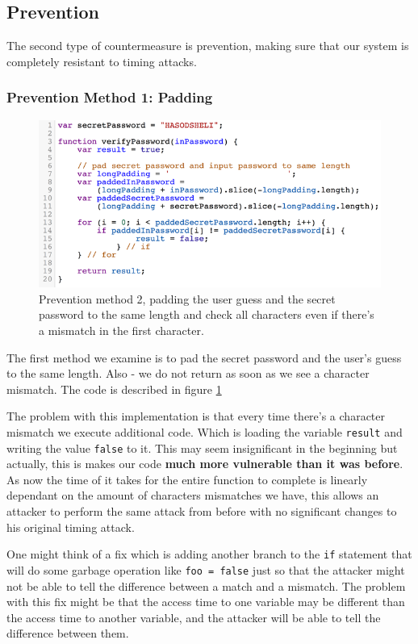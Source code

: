 \subsection{Prevention}
The second type of countermeasure is prevention, making sure that our system is completely resistant to timing attacks.

\subsubsection{Prevention Method 1: Padding}
\begin{figure}[H]
    \centering
    \includegraphics{images/chapter_1/password_check_algo_2.png}
    \caption
    {Prevention method 2, padding the user guess and the secret password to the 
    same length and check all characters even if there's a mismatch in the first character.}
    \label{c1_fig_pass_check_2}
\end{figure}

The first method we examine is to pad the secret password and the user's guess to the same length.
Also - we do not return as soon as we see a character mismatch.
 The code is described in figure 
 \ref{c1_fig_pass_check_2}

The problem with this implementation is that every time there's a character mismatch we execute additional code.
Which is loading the variable \lstinline{result} and writing the value \lstinline{false} to it.
This may seem insignificant in the beginning but actually, this is makes our code \textbf{much more vulnerable than it was before}.
As now the time of it takes for the entire function to complete is linearly dependant on the amount of characters mismatches we have, 
this allows an attacker to perform the same attack from before with no significant changes to his original timing attack.

One might think of a fix which is adding another branch to the \lstinline{if} statement that will do some garbage operation like \lstinline{foo = false}
just so that the attacker might not be able to tell the difference between a match and a mismatch.
The problem with this fix might be that the access time to one variable may be different than the access time to another variable,
and the attacker will be able to tell the difference between them.


